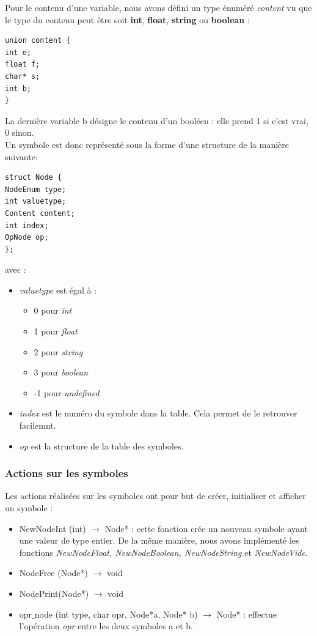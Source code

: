 \documentclass{article}
\begin{document}
Pour le contenu d'une variable, nous avons défini un type énuméré \emph{content} vu que le type du contenu peut être soit \textbf{int}, \textbf{float}, \textbf{string} ou \textbf{boolean} :
\begin{verbatim}
union content {
int e;
float f;
char* s;
int b;
}
\end{verbatim}
La dernière variable b désigne le contenu d'un booléen : elle prend 1 si c'est vrai, 0 sinon. \\

Un symbole est donc représenté sous la forme d'une structure de la manière suivante:  
\begin{verbatim}
struct Node { 
NodeEnum type; 
int valuetype; 
Content content; 
int index; 
OpNode op;
};
\end{verbatim}

avec :
\begin{itemize}
\item \emph{valuetype} est égal à :
\begin{itemize}
\item 0 pour \emph{int} 
\item 1 pour \emph{float} 
\item 2 pour \emph{string}
\item 3 pour \emph{boolean}
\item -1 pour \emph{undefined}
\end{itemize}
\item \emph{index} est le numéro du symbole dans la table. Cela permet de le retrouver facilemnt. 
\item \emph{op} est la structure de la table des symboles. 
\end{itemize}

\subsubsection*{Actions sur les symboles}
Les actions réalisées sur les symboles ont pour but de créer, initialiser et afficher un symbole : \\
\begin{itemize}
\item NewNodeInt (int) $\rightarrow$ Node* : cette fonction crée un nouveau symbole ayant une valeur de type entier. De la même manière, nous avons implémenté les fonctions \emph{NewNodeFloat, NewNodeBoolean, NewNodeString} et \emph{NewNodeVide}.
\item NodeFree (Node*) $\rightarrow$ void
\item NodePrint(Node*) $\rightarrow$ void
\item opr$\_$node (int type, char opr, Node*a, Node* b) $\rightarrow$ Node* : effectue l'opération \emph{opr} entre les deux symboles a et b.
\end{itemize}
\end{document}

